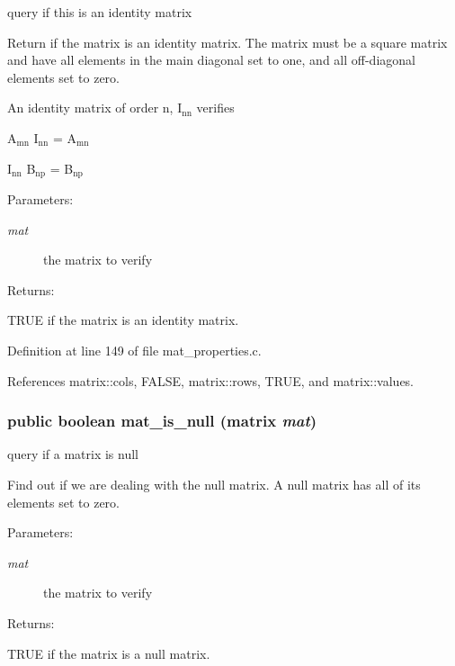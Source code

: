 query if this is an identity matrix

Return if the matrix is an identity matrix. The matrix must be a square matrix and have all elements in the main diagonal set to  one, and all off-diagonal elements set to zero.

An identity matrix of order n, I$_{\mbox{nn}}$ verifies

A$_{\mbox{mn}}$ I$_{\mbox{nn}}$ = A$_{\mbox{mn}}$

I$_{\mbox{nn}}$ B$_{\mbox{np}}$ = B$_{\mbox{np}}$\begin{Desc}
\item[Parameters: ]\par
\begin{description}
\item[{\em 
mat}]the matrix to verify\end{description}
\end{Desc}
\begin{Desc}
\item[Returns: ]\par
TRUE if the matrix is an identity matrix. \end{Desc}


Definition at line 149 of file mat\_\-properties.c.

References matrix::cols, FALSE, matrix::rows, TRUE, and matrix::values.
\subsubsection{\setlength{\rightskip}{0pt plus 5cm}public {\bf boolean} mat\_\-is\_\-null ({\bf matrix} {\em mat})}\label{group__matrix__properties_a3}


query if a matrix is null

Find out if we are dealing with the null matrix. A null matrix has all of its elements set to zero.\begin{Desc}
\item[Parameters: ]\par
\begin{description}
\item[{\em 
mat}]the matrix to verify\end{description}
\end{Desc}
\begin{Desc}
\item[Returns: ]\par
TRUE if the matrix is a null matrix. \end{Desc}


